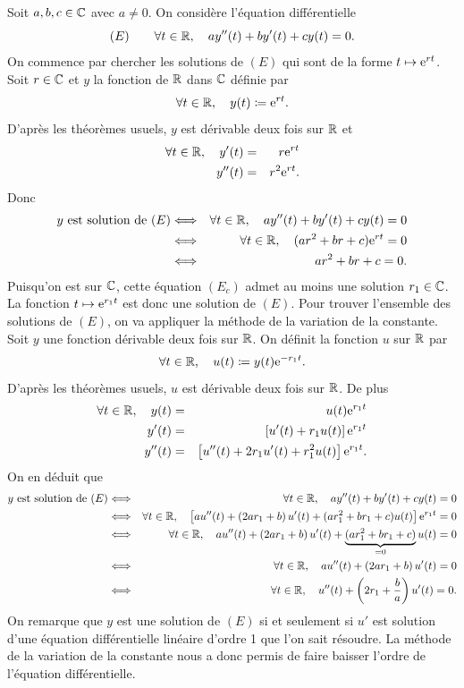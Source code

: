 \documentclass{magnoliaold}
\begin{document}
\begin{preuve}
\begin{francois}
Soit $a, b, c\in\mathbb{C}$ avec $a\neq 0$. On considère l'équation différentielle
\[(E)\qquad \forall t\in\mathbb{R} ,\quad a y''(t)+by'(t)+cy(t)=0.\]
On commence par chercher les solutions de $(E)$ qui sont de la forme $t\mapsto{\rm e}^{r t}$. Soit $r\in\mathbb{C}$ et $y$ la fonction de $\mathbb{R}$ dans $\mathbb{C}$ définie par
\[\forall t\in\mathbb{R},\quad y(t)\coloneqq{\rm e}^{rt}.\]
D'après les théorèmes usuels, $y$ est dérivable deux fois sur $\mathbb{R}$ et
\begin{eqnarray*}
\forall t\in\mathbb{R},\quad y'(t)&=&r{\rm e}^{rt}\\
y''(t)&=&r^2{\rm e}^{rt}.
\end{eqnarray*}
Donc
\begin{eqnarray*}
\text{$y$ est solution de $(E)$}
&\Longleftrightarrow& \forall t\in\mathbb{R} ,\quad a y''(t)+by'(t)+cy(t)=0\\
&\Longleftrightarrow& \forall t\in \mathbb{R},\quad (ar^2+br+c){\rm e}^{rt}=0\\
&\Longleftrightarrow& ar^2+br+c=0.
\end{eqnarray*}
Puisqu'on est sur $\mathbb{C}$, cette équation $(E_c)$ admet au moins une solution $r_1\in\mathbb{C}$. La fonction $t\mapsto {\rm e}^{r_1 t}$ est donc une solution de $(E)$. Pour trouver l'ensemble des solutions de $(E)$, on va appliquer la méthode de la variation de la constante. Soit $y$ une fonction dérivable deux fois sur $\mathbb{R}$. On définit la fonction $u$ sur $\mathbb{R}$ par
\[\forall t\in\mathbb{R},\quad u(t)\coloneqq y(t){\rm e}^{-r_1 t}.\]
D'après les théorèmes usuels, $u$ est dérivable deux fois sur $\mathbb{R}$. De plus
\begin{eqnarray*}
\forall t\in\mathbb{R},\quad y(t)&=&u(t){\rm e}^{r_1 t}\\
y'(t)&=&\left[u'(t)+r_1 u(t)\right]{\rm e}^{r_1 t}\\
y''(t)&=&\left[u''(t)+2r_1 u'(t)+r_1^2 u(t)\right]{\rm e}^{r_1 t}.
\end{eqnarray*}
On en déduit que
\begin{eqnarray*}
\text{$y$ est solution de $(E)$}
&\Longleftrightarrow& \forall t\in\mathbb{R} ,\quad a y''(t)+by'(t)+cy(t)=0\\
&\Longleftrightarrow& \forall t\in \mathbb{R},\quad \left[a u''(t)+\left(2ar_1+b\right)u'(t)+(ar_1^2+br_1+c)u(t)\right]{\rm e}^{r_1 t}=0\\
&\Longleftrightarrow& \forall t\in \mathbb{R},\quad a u''(t)+\left(2ar_1+b\right)u'(t)+\underbrace{(ar_1^2+br_1+c)}_{=0}u(t)=0\\
&\Longleftrightarrow& \forall t\in \mathbb{R},\quad a u''(t)+\left(2ar_1+b\right)u'(t)=0\\
&\Longleftrightarrow& \forall t\in \mathbb{R},\quad u''(t)+\left(2r_1+\frac{b}{a}\right)u'(t)=0.
\end{eqnarray*}
On remarque que $y$ est une solution de $(E)$ si et seulement si $u'$ est solution d'une équation différentielle linéaire d'ordre 1 que l'on sait résoudre. La méthode de la variation de la constante nous a donc permis de faire baisser l'ordre de l'équation différentielle.

\end{francois}
\end{preuve}
\end{document}
